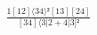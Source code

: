 \documentclass[varwidth, border=5pt]{standalone}
\begin{document}
\begin{my}
$\begin{gathered}
\scriptscriptstyle\frac{1[12]⟨34⟩²[13][24]}{[34]⟨3|2+4|3]²}
\end{gathered}$
\end{my}
\end{document}
